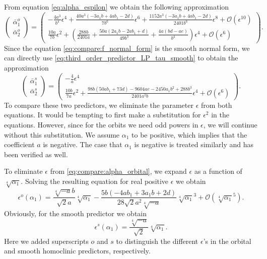 From equation \cref{eq:alpha_espilon} we obtain the following approximation
\begin{equation}
\label{eq:compare:alpha_orbital}
\begin{pmatrix}
\bar \alpha_1^o \\[5pt] \bar \alpha_2^o
\end{pmatrix}
=
\begin{pmatrix}
-\frac{4a^3}{b^4} \epsilon^4
        + \frac{40a^3(-3a_1b+4ab_1-2d)}{7b^6} \epsilon^6
        + \frac{1152 a^3(-3a_1b + 4ab_1 -2d)}{2401 b^6} \epsilon^8
				+ \mathcal{O}(\epsilon^{10}) \\
\frac{10a}{7b} \epsilon^2
				+ \left( \frac{288b}{2401a} + \frac{50a(2a_1b-2ab_1+d)}{49b^3}
				+ \frac{4a(bd-ae)}{b^4} \right) \epsilon^4
				+ \mathcal{O}(\epsilon^{6})
\end{pmatrix}.
\end{equation}
Since the equation \cref{eq:compare:f_normal_form} is the smooth normal form, we can 
directly use \cref{eq:third_order_predictor_LP_tau_smooth} to obtain the
approximation
\begin{equation}
\label{eq:compare:alpha_smooth}
\begin{pmatrix}
\bar \alpha_1^s \\[5pt] \bar \alpha_2^s
\end{pmatrix}
=
\begin{pmatrix}
-\frac{4}{a} \epsilon^4 \\[5pt]
\frac{10b}{7a} \epsilon^2
				+ \frac{98 b (50 a b_1+73 d)-9604 a e-2450 a_1 b^2+288 b^3}{2401 a^2 b} \epsilon^4
				+ \mathcal{O}(\epsilon^6)
\end{pmatrix}.
\end{equation}
To compare these two predictors, we eliminate the parameter $\epsilon$ from both
equations. It would be tempting to first make a substitution for $\epsilon^2$ in
the equations. However, since for the orbits we need odd powers in $\epsilon$,
we will continue without this substitution. We assume $\alpha_1$ to be
positive, which implies that the coefficient $a$ is negative. The case that
$\alpha_1$ is negative is treated similarly and has been verified as well.

To eliminate $\epsilon$ from \cref{eq:compare:alpha_orbital}, we expand $\epsilon$
as a function of $\sqrt[4]{\alpha_1}$. Solving the resulting equation for real
positive $\epsilon$ we obtain
\begin{equation}
    \label{eq:compare:epsilon0}
    \epsilon^o(\alpha_1) = \frac{\sqrt[4]{-a} b}{\sqrt{2}a}\sqrt[4]{\alpha_1}-\frac{5 b  (-4 a
    b_1+3 a_1 b+2 d)}{28 \sqrt{2} a^2 \sqrt[4]{-a}}\sqrt[4]{\alpha_1} ^3 + \mathcal{O}(\sqrt[4]{\alpha_1}^5).
\end{equation}
Obviously, for the smooth predictor we obtain
\begin{equation*}
    \epsilon^s(\alpha_1) = \frac{\sqrt[4]{-a}}{\sqrt2} \sqrt[4]{\alpha_1}.
\end{equation*}
Here we added superscripts $o$ and $s$ to distinguish the different
$\epsilon$'s in the orbital and smooth homoclinic predictors,
respectively.

